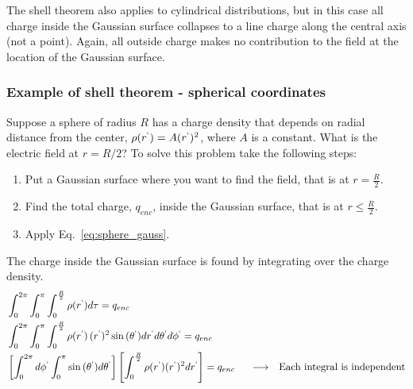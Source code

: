 \documentclass[12pt]{article}
\begin{document}
\begin{flushleft}
The shell theorem also applies to cylindrical distributions, but in this case all charge inside the Gaussian surface collapses to a line charge along the central axis (not a point).  Again, all outside charge makes no contribution to the field at the location of the Gaussian surface.

\subsubsection*{\bf Example of shell theorem - spherical coordinates}

Suppose a sphere of radius $R$ has a charge density that depends on radial distance from the center, $\rho(r^{`})=A(r^{`})^{2}$, where $A$ is a constant.  What is the electric field at $r=R/2$?  To solve this problem take the following steps:
\begin{enumerate}
\item Put a Gaussian surface where you want to find the field, that is at $r=\frac{R}{2}$.
\item Find the total charge, $q_{enc}$, inside the Gaussian surface, that is at $r\leq \frac{R}{2}$.
\item Apply Eq.~\ref{eq:sphere_gauss}.
\end{enumerate}

The charge inside the Gaussian surface is found by integrating over the charge density.
\begin{equation*}
\begin{aligned}
& \int^{2\pi}_{0} \int^{\pi}_{0}  \int^{\frac{R}{2}}_{0} \rho(r^{`}) d\tau= q_{enc} \\
& \int^{2\pi}_{0} \int^{\pi}_{0}  \int^{\frac{R}{2}}_{0} \rho(r^{`}) \, (r^{`})^{2}\sin{(\theta^{`})}dr^{`}d\theta^{`}d\phi^{`}=q_{enc}\\
& \left[ \int^{2\pi}_{0} d\phi^{`} \int^{\pi}_{0}  \sin{(\theta^{`})}d\theta^{`}\right] \left[ \int^{\frac{R}{2}}_{0} \rho(r^{`})  (r^{`})^{2}dr^{`} \right] =q_{enc} \hspace{.2in} \longrightarrow \hspace{.1in} \mbox{Each integral is independent}  \\
\end{aligned}
\end{equation*}


\end{flushleft}
\end{document}
